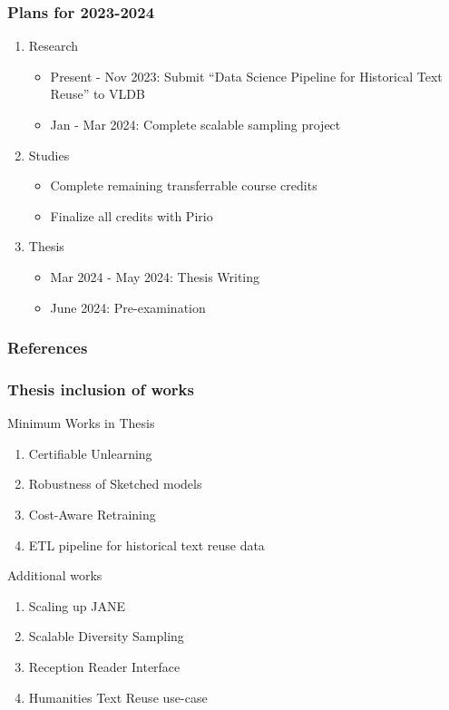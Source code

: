 \documentclass[pdf]{beamer}
\begin{document}
\begin{frame}
    \frametitle{Plans for 2023-2024}
    \begin{enumerate}
        \item Research
        \begin{itemize}
            \item Present - Nov 2023: Submit ``Data Science Pipeline for Historical Text Reuse'' to VLDB
            \item Jan - Mar 2024: Complete scalable sampling project
        \end{itemize}
        \item Studies
        \begin{itemize}
            \item Complete remaining transferrable course credits
            \item Finalize all credits with Pirio
        \end{itemize}
        \item Thesis
        \begin{itemize}
            \item Mar 2024 - May 2024: Thesis Writing
            \item June 2024: Pre-examination
        \end{itemize}
    \end{enumerate}
    

\end{frame}

\begin{frame}[allowframebreaks]
    \frametitle{References}
    
    
  \end{frame}


\begin{frame}
    \frametitle{Thesis inclusion of works}
    Minimum Works in Thesis
    \begin{enumerate}
        \item Certifiable Unlearning 
        \item Robustness of Sketched models
        \item Cost-Aware Retraining
        \item ETL pipeline for historical text reuse data
    \end{enumerate}
    Additional works 
    \begin{enumerate}
        \item Scaling up JANE 
        \item Scalable Diversity Sampling
        \item Reception Reader Interface
        \item Humanities Text Reuse use-case
    \end{enumerate}
    

\end{frame}
\end{document}
